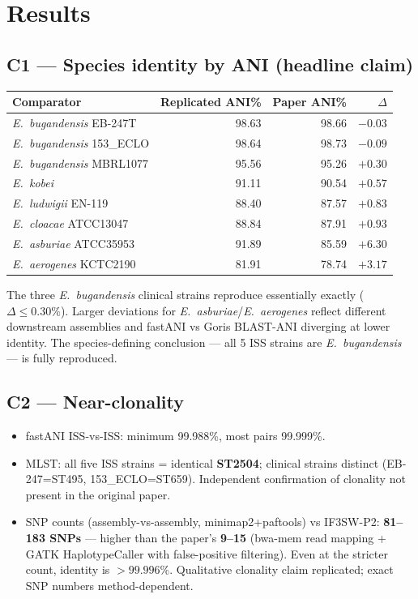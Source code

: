 \documentclass[11pt]{article}
\begin{document}
\section{Results}

\subsection{C1 --- Species identity by ANI (headline claim)}
\begin{longtable}{@{}l r r r@{}}
\toprule
Comparator & Replicated ANI\% & Paper ANI\% & $\Delta$ \\ \midrule
\textit{E.~bugandensis} EB-247T & 98.63 & 98.66 & $-0.03$ \\
\textit{E.~bugandensis} 153\_ECLO & 98.64 & 98.73 & $-0.09$ \\
\textit{E.~bugandensis} MBRL1077 & 95.56 & 95.26 & $+0.30$ \\
\textit{E.~kobei}                 & 91.11 & 90.54 & $+0.57$ \\
\textit{E.~ludwigii} EN-119       & 88.40 & 87.57 & $+0.83$ \\
\textit{E.~cloacae} ATCC13047     & 88.84 & 87.91 & $+0.93$ \\
\textit{E.~asburiae} ATCC35953    & 91.89 & 85.59 & $+6.30$ \\
\textit{E.~aerogenes} KCTC2190    & 81.91 & 78.74 & $+3.17$ \\
\bottomrule
\end{longtable}
The three \textit{E.~bugandensis} clinical strains reproduce essentially exactly
($\Delta \leq 0.30\%$). Larger deviations for \textit{E.~asburiae}/\textit{E.~aerogenes} reflect
different downstream assemblies and fastANI vs Goris BLAST-ANI diverging at lower identity.
The species-defining conclusion --- all 5 ISS strains are \textit{E.~bugandensis} ---
is fully reproduced.

\subsection{C2 --- Near-clonality}
\begin{itemize}[leftmargin=1.3em]
  \item fastANI ISS-vs-ISS: minimum 99.988\%, most pairs 99.999\%.
  \item MLST: all five ISS strains = identical \textbf{ST2504}; clinical strains distinct
        (EB-247=ST495, 153\_ECLO=ST659). Independent confirmation of clonality not present
        in the original paper.
  \item SNP counts (assembly-vs-assembly, minimap2+paftools) vs IF3SW-P2: \textbf{81--183 SNPs} ---
        higher than the paper's \textbf{9--15} (bwa-mem read mapping + GATK HaplotypeCaller with
        false-positive filtering). Even at the stricter count, identity is ${>}99.996\%$.
        Qualitative clonality claim replicated; exact SNP numbers method-dependent.
\end{itemize}
\end{document}
